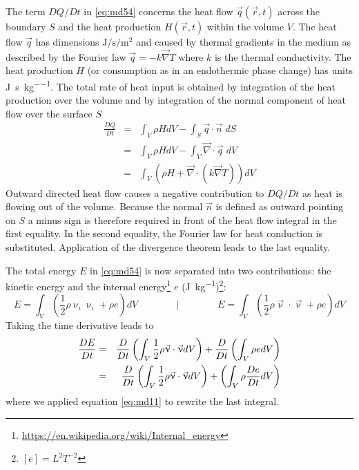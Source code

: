 The term $DQ/Dt$ in \eqref{eq:md54} concerns the heat flow $\vec{q}(\vec{r},t)$
across the boundary $S$ and the heat production $H(\vec{r},t)$
within the volume $V$. The heat flow $\vec{q}$ has dimensions 
$\si{\joule\per\second\per\square\meter}$
and caused by thermal gradients in the medium as described by the Fourier law
$\vec{q}=-k \vec\nabla T$ where $k$ is the thermal conductivity. 
The heat production $H$ (or consumption as in an endothermic phase change) has units 
\si{\joule\per\second\per\kg}.
The total rate of heat input is
obtained by integration of the heat production over the volume and by integration of the
normal component of heat flow over the surface $S$
\begin{eqnarray}
\frac{DQ}{Dt} 
&=& \int_V \rho H dV - \int_S \vec{q} \cdot \vec{n} \; dS \\
&=& \int_V \rho H dV - \int_V \vec\nabla \cdot \vec{q}  \; dV \\
&=& \int_V \left(  \rho H + \vec\nabla \cdot (  k \vec\nabla T )  \right) dV 
\label{eq:md58}
\end{eqnarray}
Outward directed heat flow causes a negative contribution to $DQ/Dt$ 
as heat is flowing out of
the volume. Because the normal $\vec{n}$ is defined as outward pointing on $S$ a minus sign is
therefore required in front of the heat flow integral in the first equality. In the second
equality, the Fourier law for heat conduction is substituted. Application of the divergence
theorem leads to the last equality.

The total energy $E$ in \eqref{eq:md54} is now separated into 
two contributions: the kinetic energy and
the internal energy\footnote{\url{https://en.wikipedia.org/wiki/Internal_energy}} 
$e$ (\si{\joule\per\kg})\footnote{$[e]=L^2T^{-2}$}:
\begin{equation}
E = \int_V \left(\frac{1}{2} \rho \upnu_i \upnu_i + \rho e \right)dV
\qquad
\qquad
\bigg\rvert
\qquad
\qquad
E = \int_V \left(\frac{1}{2} \rho \vec\upnu\cdot \vec\upnu + \rho e \right)dV
\label{eq:md59}
\end{equation}
Taking the time derivative leads to
\begin{eqnarray}
\frac{DE}{Dt} 
&=& \frac{D}{Dt} \left( \int_V \frac12 \rho \vec\upnu\cdot\vec\upnu dV   \right)
+ \frac{D}{Dt} \left( \int_V \rho e dV  \right) \nonumber\\
&=& \frac{D}{Dt} \left( \int_V \frac12 \rho \vec\upnu \cdot \vec\upnu dV   \right)
+ \left( \int_V \rho \frac{De}{Dt} dV  \right) 
\label{eq:md60}
\end{eqnarray}
where we applied equation \eqref{eq:md11} to rewrite the last integral.

